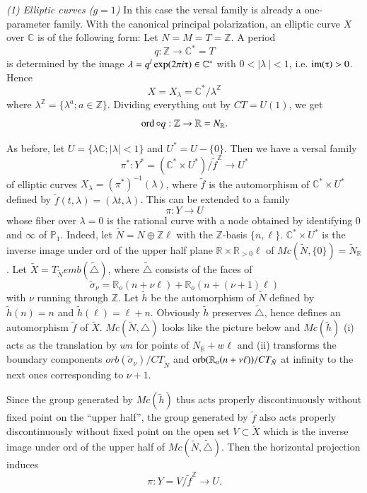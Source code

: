 \begin{example}
{\em{(1)  Elliptic curves ($g = 1$)}} In this case the versal family is
already a one-parameter family. With the canonical principal
polarization, an elliptic curve $X$ over $\mathbb{C}$ is of the
following form: Let $N = M = T = \mathbb{Z}$. A period 
$$ 
q : \mathbb{Z} \rightarrow \mathbb{C}^* = T 
$$\pageoriginale
is determined by the image $\lambda = q^l \exp(2\pi i \tauup) \in
\mathbb{C}^*$ with $0 < | \lambda~ |  < 1$, i.e. $\im (\tauup) > 0$. Hence 
$$
X = X_\lambda = \mathbb{C}^*/\lambda^{\mathbb{Z}} 
$$
where $\lambda^{\mathbb{Z}} = \{\lambda^a ; a \in
\mathbb{Z}\}$. Dividing everything out by $CT = U(1)$, we get 
$$
\operatorname{ord} \circ q : \mathbb{Z} \rightarrow \mathbb{R} = N_{\mathbb{R}}. 
$$
\end{example}

As before, let $U = \{\lambda \mathbb{C} ; | \lambda | < 1\}$ and $U^* 
= U - \{0\}$. Then we have a versal family 
$$
\pi^* : Y^* = (\mathbb{C}^* \times U^*) /\tilde{f}^{\mathbb{Z}}
\rightarrow U^* 
$$
of elliptic curves $X_\lambda = (\pi^*)^{-1} (\lambda)$, where
$\tilde{f}$ is the automorphism of $\mathbb{C}^* \times U^* $ defined by
$\tilde{f}(t,\lambda) = (\lambda t, \lambda)$. This can be extended to
a family 
$$
\pi : Y \rightarrow U 
$$
whose fiber over $\lambda = 0$ is the rational curve with a node
obtained by identifying 0 and $\infty$ of $\mathbb{P}_1$. Indeed, let
$\tilde{N} = N \oplus \mathbb{Z}\ell $ with the $\mathbb{Z}$-basis
$\{n,\ell\}$. $\mathbb{C}^* \times U^*$ is the inverse image under ord of
the upper half plane $\mathbb{R} \times \mathbb{R}_{>0}\ell $ of $Mc
(\tilde{N},\{0\}) = \tilde{N}_{\mathbb{R}}$. Let $\tilde{X}=
T_{\tilde{N}}emb(\tilde{\triangle})$, where $\tilde{\triangle}$
consists of the faces of   
$$
\tilde{\sigma}_\nu = \mathbb{R}_o (n + \nu \ell ) + \mathbb{R}_o (n+
(\nu + 1) \ell) 
$$
with $\nu$ running through $\mathbb{Z}$. Let $\tilde{h}$ be the
automorphism of $\tilde{N}$ defined by $\tilde{h}(n) = n$ and
$\tilde{h}(\ell) = \ell + n$. Obviously $\tilde{h}$
preserves\pageoriginale 
$\tilde{\triangle}$, hence defines an automorphism $\tilde{f}$ of
$\tilde{X}$. $Mc(\tilde{N},\triangle)$ looks like the picture below
and $Mc(\tilde{h})$ (i) acts as the translation by $wn$ for points of
$N_{\mathbb{R}} + w\ell$ and (ii) transforms the boundary components
$orb(\tilde{\sigma}_\nu)/CT_{\tilde{N}} $ and $\operatorname{orb}
(\mathbb{R}_o(n+\nu\ell))/CT_{\tilde{N}}$ at infinity to the next ones
corresponding to $\nu + 1$. 

Since the group generated by $Mc(\tilde{h})$ thus acts properly
discontinuously without fixed point on the ``upper half'', the group
generated by $\tilde{f}$ also acts properly discontinuously without
fixed point on the open set $V \subset \tilde{X}$ which is the inverse
image under ord of the upper half of
$Mc(\tilde{N},\tilde{\triangle})$. Then the horizontal projection
induces  
$$
\pi : Y = V/\tilde{f}^{\mathbb{Z}} \rightarrow U. 
$$

